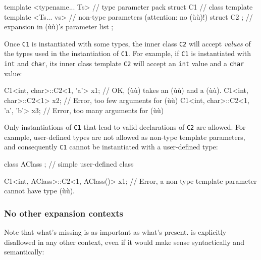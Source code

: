 \begin{emcppslisting}[emcppsbatch=e33]
template <typename... Ts>  // type parameter pack
struct C1                  // class template
{
    template <Ts... vs>    // non-type parameters (attention: no (ù{}ù)!)
    struct C2 { };         // expansion in (ù{}ù)'s parameter list
};
\end{emcppslisting}
    

\noindent Once \lstinline!C1! is instantiated with some types, the inner class
\lstinline!C2! will accept \emph{values} of the types used in the
instantiation of \lstinline!C1!. For example, if \lstinline!C1! is
instantiated with \lstinline!int! and \lstinline!char!, its inner class
template \lstinline!C2! will accept an \lstinline!int! value and a
\lstinline!char! value:

\begin{emcppslisting}[emcppsbatch=e33]
C1<int, char>::C2<1, 'a'> x1;       // OK, (ù{}ù) takes an (ù{}ù) and a (ù{}ù).
C1<int, char>::C2<1> x2;            // Error, too few arguments for (ù{}ù)
C1<int, char>::C2<1, 'a', 'b'> x3;  // Error, too many arguments for (ù{}ù)
\end{emcppslisting}
    

\noindent Only instantiations of \lstinline!C1! that lead to valid declarations of
\lstinline!C2! are allowed. For example, user-defined types are not allowed
as non-type template parameters, and consequently \lstinline!C1! cannot be
instantiated with a user-defined type:

\begin{emcppslisting}[emcppsbatch=e33]
class AClass { };   // simple user-defined class

C1<int, AClass>::C2<1, AClass()> x1;
    // Error, a non-type template parameter cannot have type (ù{}ù).
\end{emcppslisting}
    

\subsubsection[No other expansion contexts]{No other expansion contexts}\label{no-other-expansion-contexts}

Note that what's missing is as important as what's present.
 is explicitly disallowed in any other
context, even if it would make sense syntactically and semantically:

